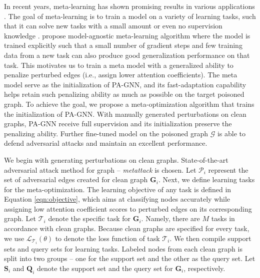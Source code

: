 \documentclass[sigconf]{acmart}
\newcommand{\ours}{{PA-GNN}\xspace}
\def \G {\mathcal{G}}
\def \P {\mathcal{P}}
\def \L {\mathcal{L}}
\def \T {\mathcal{T}}
\def \bg {\mathbf{G}}
\def \S {\mathbf{S}}
\def \Q {\mathbf{Q}}
\begin{document}
In recent years, meta-learning has shown promising results in various applications \cite{santoro2016meta,vinyals2016matching,yao2019learning,yao2019graph}. The goal of meta-learning is to train a model on a variety of learning tasks, such that it can solve new tasks with a small amount or even no supervision knowledge \cite{hochreiter2001learning,finn2017model,yao2019hierarchically}.
\citeauthor{finn2017model} \cite{finn2017model} propose model-agnostic meta-learning algorithm  where the model is trained explicitly such that a small number of gradient steps and few training data from a new task can also produce good generalization performance on that task. 
This motivates us to train a meta model with a generalized ability to penalize perturbed edges (i.e., assign lower attention coefficients).
The meta model serve as the initialization of \ours, and its fast-adaptation capability helps retain such penalizing ability as much as possible on the target poisoned graph. 
To achieve the goal, we propose a meta-optimization algorithm that trains the initialization of \ours. With manually generated perturbations on clean graphs, \ours receive full supervision and its initialization preserve the penalizing ability. 
Further fine-tuned model on the poisoned graph $\G$ is able to defend adversarial attacks and maintain an excellent performance.

We begin with generating perturbations on clean graphs. State-of-the-art adversarial attack method for graph -- \textit{metattack} \cite{zugner2018adversarial2} is chosen. Let $\P_i$ represent the set of adversarial edges created for clean graph $\bg_i$. 
Next, we define learning tasks for the meta-optimization. 
The learning objective of any task is defined in Equation \ref{eqn:objective}, which aims at classifying nodes accurately while assigning low attention coefficient scores to perturbed edges on its corresponding graph. Let $\T_i$ denote the specific task for $\bg_i$. Namely, there are $M$ tasks in accordance with clean graphs.
Because clean graphs are specified for every task, we use $\L_{\T_i}(\theta)$ to denote the loss function of task $\T_i$. 
We then compile support sets and query sets for learning tasks. Labeled nodes from each clean graph is split into two groups -- one for the support set and the other as the query set. Let $\S_i$ and $\Q_i$  denote the support set and the query set for $\bg_i$, respectively. 
\end{document}
